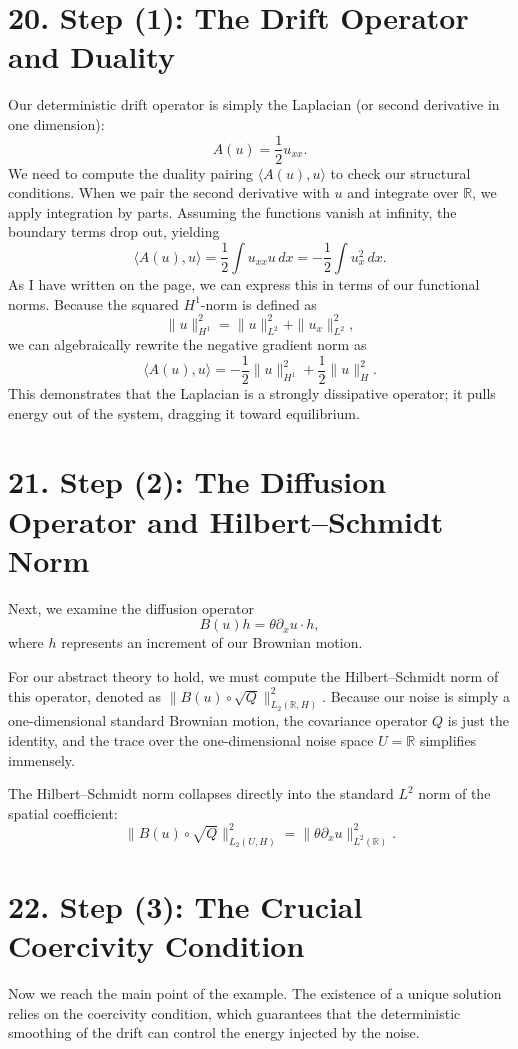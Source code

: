 \documentclass[11pt]{article}
\theoremstyle{definition}
\theoremstyle{remark}
\begin{document}
\section*{20. Step (1): The Drift Operator and Duality}
Our deterministic drift operator is simply the Laplacian (or second derivative in one dimension):
\[
A(u)=\frac{1}{2}u_{xx}.
\]
We need to compute the duality pairing $\langle A(u),u\rangle$ to check our structural conditions. When we pair the second derivative with $u$ and integrate over $\mathbb{R}$, we apply integration by parts. Assuming the functions vanish at infinity, the boundary terms drop out, yielding
\[
\langle A(u),u\rangle=\frac{1}{2}\int u_{xx}u\,dx=-\frac{1}{2}\int u_x^2\,dx.
\]
As I have written on the page, we can express this in terms of our functional norms. Because the squared $H^1$-norm is defined as
\[
\|u\|_{H^1}^2=\|u\|_{L^2}^2+\|u_x\|_{L^2}^2,
\]
we can algebraically rewrite the negative gradient norm as
\[
\langle A(u),u\rangle=-\frac{1}{2}\|u\|_{H^1}^2+\frac{1}{2}\|u\|_H^2.
\]
This demonstrates that the Laplacian is a strongly dissipative operator; it pulls energy out of the system, dragging it toward equilibrium.

\section*{21. Step (2): The Diffusion Operator and Hilbert--Schmidt Norm}
Next, we examine the diffusion operator
\[
B(u)h=\theta\partial_x u\cdot h,
\]
where $h$ represents an increment of our Brownian motion.

For our abstract theory to hold, we must compute the Hilbert--Schmidt norm of this operator, denoted as $\|B(u)\circ \sqrt{Q}\|_{L_2(\mathbb{R},H)}^2$. Because our noise is simply a one-dimensional standard Brownian motion, the covariance operator $Q$ is just the identity, and the trace over the one-dimensional noise space $U=\mathbb{R}$ simplifies immensely.

The Hilbert--Schmidt norm collapses directly into the standard $L^2$ norm of the spatial coefficient:
\[
\|B(u)\circ \sqrt{Q}\|_{L_2(U,H)}^2=\|\theta\partial_x u\|_{L^2(\mathbb{R})}^2.
\]

\section*{22. Step (3): The Crucial Coercivity Condition}
Now we reach the main point of the example. The existence of a unique solution relies on the coercivity condition, which guarantees that the deterministic smoothing of the drift can control the energy injected by the noise.
\end{document}
